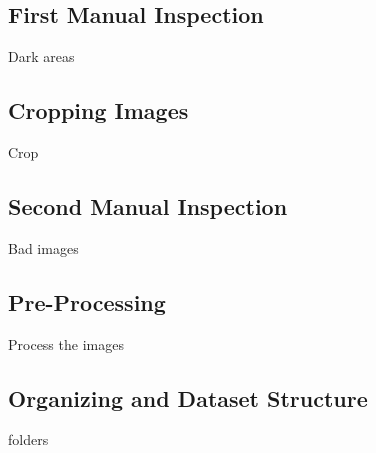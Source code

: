 \subsection{First Manual Inspection}

Dark areas

\subsection{Cropping Images}

Crop

\subsection{Second Manual Inspection}

Bad images

\subsection{Pre-Processing}

Process the images

\subsection{Organizing and Dataset Structure}

folders